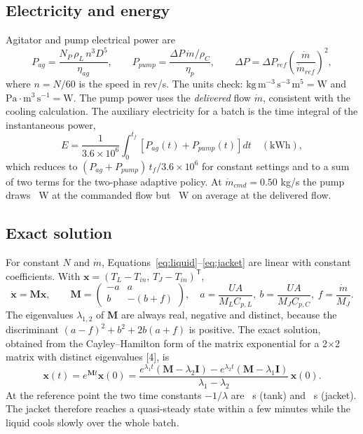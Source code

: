 \documentclass[11pt,letterpaper]{article}
\newcommand{\mdot}{\dot m}
\begin{document}
\subsection{Electricity and energy}
Agitator and pump electrical power are
\begin{equation}
P_{ag} = \frac{N_P\,\rho_L\,n^3 D^5}{\eta_{ag}},\qquad
P_{pump} = \frac{\Delta P\,\mdot/\rho_C}{\eta_p},\qquad \Delta P = \Delta P_{ref}\left(\frac{\mdot}{\mdot_{ref}}\right)^{2}, \label{eq:power}
\end{equation}
where \(n=N/60\) is the speed in rev/s. The units check: \(\mathrm{kg\,m^{-3}\,s^{-3}\,m^5 = W}\) and \(\mathrm{Pa \cdot m^3\,s^{-1} = W}\). The pump power uses the \emph{delivered} flow \(\mdot\), consistent with the cooling calculation. The auxiliary electricity for a batch is the time integral of the instantaneous power,
\begin{equation}
E = \frac{1}{3.6\times10^{6}}\int_0^{t_f}\left[P_{ag}(t) + P_{pump}(t)\right]dt\quad\mathrm{(kWh)}, \label{eq:energy}
\end{equation}
which reduces to \((P_{ag}+P_{pump})\,t_f/3.6\times10^6\) for constant settings and to a sum of two terms for the two-phase adaptive policy. At \(\mdot_{cmd}=0.50\) kg/s the pump draws \vPumpWCmd\ W at the commanded flow but \vPumpWMean\ W on average at the delivered flow.

\subsection{Exact solution}
For constant \(N\) and \(\mdot\), Equations~\ref{eq:liquid}--\ref{eq:jacket} are linear with constant coefficients. With \(\mathbf{x} = (T_L - T_{in},\, T_J - T_{in})^{\mathsf T}\),
\begin{equation}
\dot{\mathbf{x}} = \mathbf{M}\mathbf{x},\qquad \mathbf{M} = \begin{pmatrix} -a & a\\ b & -(b+f)\end{pmatrix},\quad a = \frac{UA}{M_LC_{p,L}},\ b = \frac{UA}{M_JC_{p,C}},\ f = \frac{\mdot}{M_J}. \label{eq:matrix}
\end{equation}
The eigenvalues \(\lambda_{1,2}\) of \(\mathbf{M}\) are always real, negative and distinct, because the discriminant \((a-f)^2+b^2+2b(a+f)\) is positive. The exact solution, obtained from the Cayley--Hamilton form of the matrix exponential for a 2\(\times\)2 matrix with distinct eigenvalues [4], is
\begin{equation}
\mathbf{x}(t) = e^{\mathbf{M}t}\mathbf{x}(0) = \frac{e^{\lambda_1 t}(\mathbf{M}-\lambda_2\mathbf{I}) - e^{\lambda_2 t}(\mathbf{M}-\lambda_1\mathbf{I})}{\lambda_1-\lambda_2}\,\mathbf{x}(0). \label{eq:exact}
\end{equation}
At the reference point the two time constants \(-1/\lambda\) are \vTauTankBase\ s (tank) and \vTauJacketBase\ s (jacket). The jacket therefore reaches a quasi-steady state within a few minutes while the liquid cools slowly over the whole batch.
\end{document}

